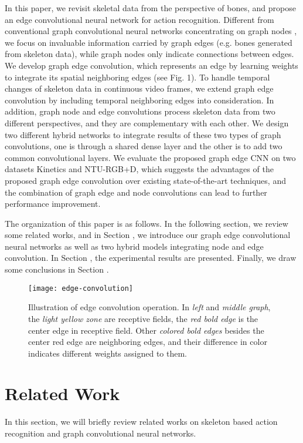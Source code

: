\documentclass[a4paper,11pt]{article}
\begin{document}
In this paper, we revisit skeletal data from the perspective of bones, and propose an edge convolutional neural network for action recognition. Different from conventional graph convolutional neural networks concentrating on graph nodes \cite{ke2017new,soo2017interpretable,yan2018spatial}, we focus on invaluable information carried by graph edges (e.g. bones generated from skeleton data), while graph nodes only indicate connections between edges.
We develop graph edge convolution, which represents an edge by learning weights to integrate its spatial neighboring edges (see Fig. 1). To handle temporal changes of skeleton data in continuous video frames, we extend graph edge convolution by including temporal neighboring edges into consideration. In addition, graph node and edge convolutions process skeleton data from two different perspectives, and they are complementary with each other.
We design two different hybrid networks to integrate results of these two types of graph convolutions, one is through a shared dense layer and the other is to add two common convolutional layers. We evaluate the proposed graph edge CNN on two datasets Kinetics and NTU-RGB+D, which suggests the advantages of the proposed graph edge convolution over existing state-of-the-art techniques, and the combination of graph edge and node convolutions can lead to further performance improvement.

The organization of this paper is as follows. In the following section, we review some related works, and in Section \uppercase\expandafter{}, we introduce our graph edge convolutional neural networks as well as two hybrid models integrating node and edge convolution. In Section \uppercase\expandafter{}, the experimental results are presented. Finally, we draw some conclusions in Section \uppercase\expandafter{}.


\begin{figure}
\centering
\texttt{[image: edge-convolution]}
\caption{Illustration of edge convolution operation. In {\it left} and {\it middle graph}, the {\it light yellow zone} are receptive fields, the {\it red bold edge} is the center edge in receptive field. Other {\it colored bold edges} besides the {center red edge} are neighboring edges, and their difference in color indicates different weights assigned to them.}
\label{fig:example}
\end{figure}


\section{Related Work}
In this section, we will briefly review related works on skeleton based action recognition and graph convolutional neural networks.
\end{document}

